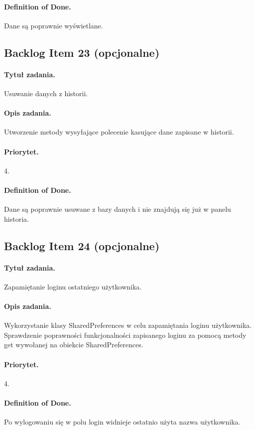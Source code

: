 \documentclass[a4paper]{article}
\begin{document}
\paragraph{Definition of Done.} Dane są poprawnie wyświetlane.

\subsection{Backlog Item 23 (opcjonalne)}
\paragraph{Tytuł zadania.} Usuwanie danych z historii.
\paragraph{Opis zadania.} Utworzenie metody wysyłające polecenie kasujące dane zapisane w historii.
\paragraph{Priorytet.} 4.
\paragraph{Definition of Done.} Dane są poprawnie usuwane z bazy danych i nie znajdują się już w panelu historia.

\subsection{Backlog Item 24 (opcjonalne)}
\paragraph{Tytuł zadania.} Zapamiętanie loginu ostatniego użytkownika.
\paragraph{Opis zadania.} Wykorzystanie klasy SharedPreferences w celu zapamiętania loginu użytkownika. Sprawdzenie poprawności funkcjonalności zapisanego loginu za pomocą metody get wywołanej na obiekcie SharedPreferences.
\paragraph{Priorytet.} 4.
\paragraph{Definition of Done.} Po wylogowaniu się w polu login widnieje ostatnio użyta nazwa użytkownika.
\end{document}
